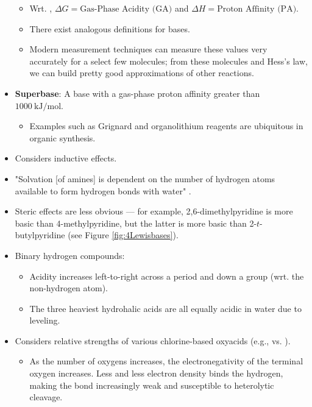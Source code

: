 \documentclass[../notes.tex]{subfiles}
\begin{document}
\begin{itemize}
    \begin{itemize}
        \item Wrt. , $\Delta G=\text{Gas-Phase Acidity (GA)}$ and $\Delta H=\text{Proton Affinity (PA)}$.
        \item There exist analogous definitions for bases.
        \item Modern measurement techniques can measure these values very accurately for a select few molecules; from these molecules and Hess's law, we can build pretty good approximations of other reactions.
    \end{itemize}
    \item \textbf{Superbase}: A base with a gas-phase proton affinity greater than $\SI[per-mode=symbol]{1000}{\kilo\joule\per\mole}$.
    \begin{itemize}
        \item Examples such as Grignard and organolithium reagents are ubiquitous in organic synthesis.
    \end{itemize}
    \item Considers inductive effects.
    \item "Solvation [of amines] is dependent on the number of hydrogen atoms available to form  hydrogen bonds with water" \parencite[181]{bib:MiesslerFischerTarr}.
    \item Steric effects are less obvious --- for example, 2,6-dimethylpyridine is more basic than 4-methylpyridine, but the latter is more basic than 2-$t$-butylpyridine (see Figure \ref{fig:4Lewisbases}).
    \item Binary hydrogen compounds:
    \begin{itemize}
        \item Acidity increases left-to-right across a period and down a group (wrt. the non-hydrogen atom).
        \item The three heaviest hydrohalic acids are all equally acidic in water due to leveling.
    \end{itemize}
    \item Considers relative strengths of various chlorine-based oxyacids (e.g.,  vs. ).
    \begin{itemize}
        \item As the number of oxygens increases, the electronegativity of the terminal oxygen increases. Less and less electron density binds the hydrogen, making the bond increasingly weak and susceptible to heterolytic cleavage.
    \end{itemize}

\end{itemize}
\end{document}
